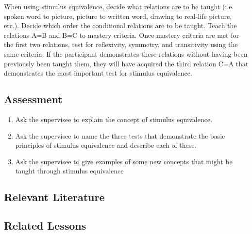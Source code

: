 When using stimulus equivalence, decide what relations are to be taught (i.e. spoken word to picture, picture to written word, drawing to real-life picture, etc.).  Decide which order the conditional relations are to be taught.  Teach the relations A=B and B=C to mastery criteria.  Once mastery criteria are met for the first two relations, test for reflexivity, symmetry, and transitivity using the same criteria.  If the participant demonstrates these relations without having been previously been taught them, they will have acquired the third relation C=A that demonstrates the most important test for stimulus equivalence.   

\subsection{Assessment}
\begin{enumerate}
\item Ask the supervisee to explain the concept of stimulus equivalence.
\item Ask the supervisee to name the three tests that demonstrate the basic principles of stimulus equivalence and describe each of these.
\item Ask the supervisee to give examples of some new concepts that might be taught through stimulus equivalence
\end{enumerate}
%
\subsection{Relevant Literature}
\begin{refsection}
\nocite{cooper2007applied,
        sidman1971reading,
        sidman1994equivalence,
        sidman1982conditional}
\printbibliography[heading=none]
\end{refsection}
%
\subsection{Related Lessons}
\foureSix{}\\
\foureThirteen{}\\
\fourFKEleven{}\\
\fourFKTwelve{}\\
\fourFKThirteen{}\\
\fourFKTwentyFour{}\\
\fourFKTwentyEight{}\\
\fourFKThirtyFive{}\\
%
